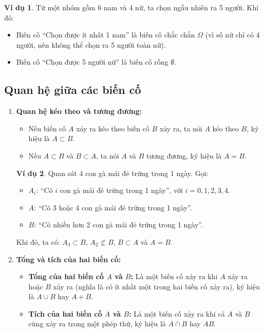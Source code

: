 \documentclass[12pt,a4paper]{article}
\theoremstyle{definition}
\newtheorem{vidu}{Ví dụ}[section]
\begin{document}
\begin{vidu}
Từ một nhóm gồm 6 nam và 4 nữ, ta chọn ngẫu nhiên ra 5 người. Khi đó:
\begin{itemize}
    \item Biến cố ``Chọn được ít nhất 1 nam'' là biến cố chắc chắn $\Omega$ (vì số nữ chỉ có 4 người, nên không thể chọn ra 5 người toàn nữ).
    \item Biến cố ``Chọn được 5 người nữ'' là biến cố rỗng $\emptyset$.
\end{itemize}
\end{vidu}

\subsection{Quan hệ giữa các biến cố}
\begin{enumerate}[label=\alph*), leftmargin=1.5em]
    \item \textbf{Quan hệ kéo theo và tương đương:}
    \begin{itemize}
        \item Nếu biến cố $A$ xảy ra kéo theo biến cố $B$ xảy ra, ta nói $A$ kéo theo $B$, ký hiệu là $A \subset B$.
        \item Nếu $A \subset B$ và $B \subset A$, ta nói $A$ và $B$ tương đương, ký hiệu là $A = B$.
    \end{itemize}

    \begin{vidu}
    Quan sát 4 con gà mái đẻ trứng trong 1 ngày. Gọi:
    \begin{itemize}
        \item $A_i$: ``Có $i$ con gà mái đẻ trứng trong 1 ngày'', với $i = 0, 1, 2, 3, 4$.
        \item $A$: ``Có 3 hoặc 4 con gà mái đẻ trứng trong 1 ngày''.
        \item $B$: ``Có nhiều hơn 2 con gà mái đẻ trứng trong 1 ngày''.
    \end{itemize}
    Khi đó, ta có: $A_3 \subset B$, $A_2 \not\subset B$, $B \subset A$ và $A = B$.
    \end{vidu}

    \item \textbf{Tổng và tích của hai biến cố:}
    \begin{itemize}
        \item \textbf{Tổng của hai biến cố $A$ và $B$:} Là một biến cố xảy ra khi $A$ xảy ra hoặc $B$ xảy ra (nghĩa là có ít nhất một trong hai biến cố xảy ra), ký hiệu là $A \cup B$ hay $A + B$.
        \item \textbf{Tích của hai biến cố $A$ và $B$:} Là một biến cố xảy ra khi cả $A$ và $B$ cùng xảy ra trong một phép thử, ký hiệu là $A \cap B$ hay $AB$.
    \end{itemize}


\end{enumerate}
\end{document}
